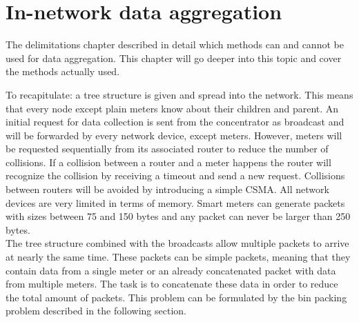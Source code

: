 \section{In-network data aggregation}
\label{sec:data_aggregation}
The delimitations chapter described in detail which methods can and cannot be used for data aggregation. This chapter will go deeper into this topic and cover the methods actually used.

To recapitulate: a tree structure is given and spread into the network. This means that every node except plain meters know about their children and parent. An initial request for data collection is sent from the concentrator as broadcast and will be forwarded by every network device, except meters. However, meters will be requested sequentially from its associated router to reduce the number of collisions. If a collision between a router and a meter happens the router will recognize the collision by receiving a timeout and send a new request. Collisions between routers will be avoided by introducing a simple CSMA. All network devices are very limited in terms of memory. Smart meters can generate packets with sizes between 75 and 150 bytes and any packet can never be larger than 250 bytes.\\
The tree structure combined with the broadcasts allow multiple packets to arrive at nearly the same time. These packets can be simple packets, meaning that they contain data from a single meter or an already concatenated packet with data from multiple meters. The task is to concatenate these data in order to reduce the total amount of packets. This problem can be formulated by the bin packing problem described in the following section.

